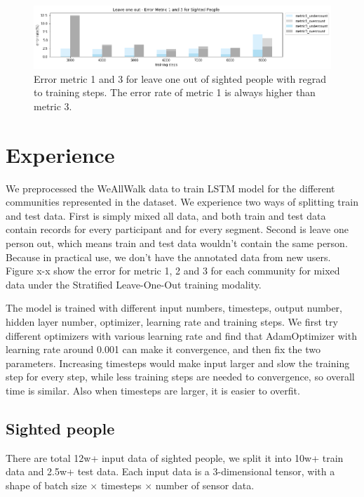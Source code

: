 \documentclass[11pt]{article}
\begin{document}
\begin{figure}[ht]
\centering
\includegraphics[scale=0.5]{error_metric_13_na_step}
\caption{Error metric 1 and 3 for leave one out of sighted people with regrad to training steps. The error rate of metric 1 is always higher than metric 3.}
\label{fig:error_metric_13_na_step}
\end{figure}


\section{Experience}

We preprocessed the WeAllWalk data to train LSTM model for the different communities represented in the dataset. 
We experience two ways of splitting train and test data. First is simply mixed all data, and both train and test data contain records for every participant and for every segment. Second is leave one person out, which means train and test data wouldn't contain the same person. Because in practical use, we don't have the annotated data from new users. 
Figure x-x show the error for metric 1, 2 and 3 for each community for mixed data under the Stratified Leave-One-Out training modality.

The model is trained with different input numbers, timesteps, output number, hidden layer number, optimizer, learning rate and training steps. We first try different optimizers with various learning rate and find that AdamOptimizer with learning rate around 0.001 can make it convergence, and then fix the two parameters. 
Increasing timesteps would make input larger and slow the training step for every step, while less training steps are needed to convergence, so overall time is similar. Also when timesteps are larger, it is easier to overfit.

\subsection{Sighted people}
There are total 12w+ input data of sighted people, we split it into 10w+ train data and 2.5w+ test data. Each input data is a 3-dimensional tensor, with a shape of batch size $\times$ timesteps $\times$ number of sensor data.
\end{document}

